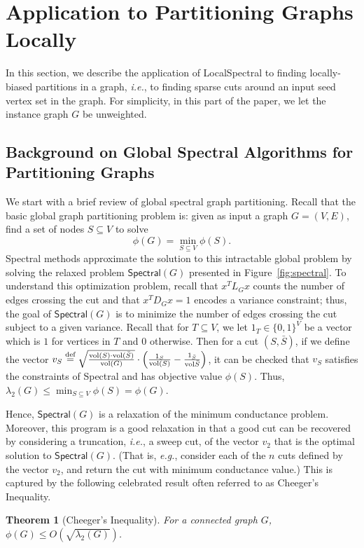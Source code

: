 \documentclass[11pt]{article}
\newtheorem{theorem}{Theorem}
\newcommand{\defeq}{\stackrel{\textup{def}}{=}}
\newcommand{\vol}{\mathrm{vol}}
\begin{document}
\section{Application to Partitioning Graphs Locally}
\label{sxn:partition}

In this section, we describe the application of \textsf{LocalSpectral} to 
finding locally-biased partitions in a graph, \emph{i.e.}, to finding 
sparse cuts around an input seed vertex set in the graph.
For simplicity, in this part of the paper, we let the instance graph $G$ be 
unweighted. 


\subsection{Background on Global Spectral Algorithms for Partitioning Graphs}
\label{sxn:partition-background}

We start with a brief review of global spectral graph partitioning.
Recall that the basic global graph partitioning problem is: given as input 
a graph $G=(V,E)$, find a set of nodes $S \subseteq V$ to solve 
$$
\phi(G)=\min_{S \subseteq V} \phi(S)  .
$$
Spectral methods approximate the solution to this intractable global problem 
by solving the relaxed problem $\textsf{Spectral}(G)$ presented in 
Figure~\ref{fig:spectral}.
To understand this optimization problem, recall that $x^TL_{G}x$ counts the 
number of edges crossing the cut and that $x^TD_{G}x=1$ encodes a variance 
constraint; thus, the goal of $\textsf{Spectral}(G)$ is to minimize the 
number of edges crossing the cut subject to a given variance. 
Recall that for $T\subseteq V$, we let $1_{T} \in \{0,1\}^{V}$ be a vector 
which is $1$ for vertices in $T$ and $0$ otherwise.
Then for  a cut $(S,\bar{S})$, if we define the vector 
$v_{S} \defeq  \sqrt{\frac{\vol(S) \cdot \vol (\bar{S})}{\vol(G)}} \cdot \left( \frac{1_{S}}{\vol(S)}-\frac{1_{\bar{S}}}{\vol{\bar{S}}}\right)$, 
it can be checked that $v_{S}$ satisfies the constraints of \textsf{Spectral} 
and has objective value $\phi(S)$. 
Thus, $\lambda_{2}(G) \leq \min_{S \subseteq V} \phi(S)= \phi(G)$. 

Hence, $\textsf{Spectral}(G)$ is a relaxation of the minimum conductance 
problem. 
Moreover, this program is a good relaxation in that a good cut can be 
recovered by considering a truncation, \emph{i.e.}, a sweep cut, of the
vector $v_{2}$ that is the optimal solution to $\textsf{Spectral}(G)$.
(That is, \emph{e.g.}, consider each of the $n$ cuts defined by the vector 
$v_{2}$, and return the cut with minimum conductance value.)
This is captured by the following celebrated result often referred to as 
Cheeger's Inequality.
\begin{theorem}[Cheeger's Inequality]
\label{thm:cheeger1}
For a connected graph $G$, 
$\phi(G) \leq O(\sqrt{ \lambda_{2}(G)})$.
\end{theorem}
\end{document}
